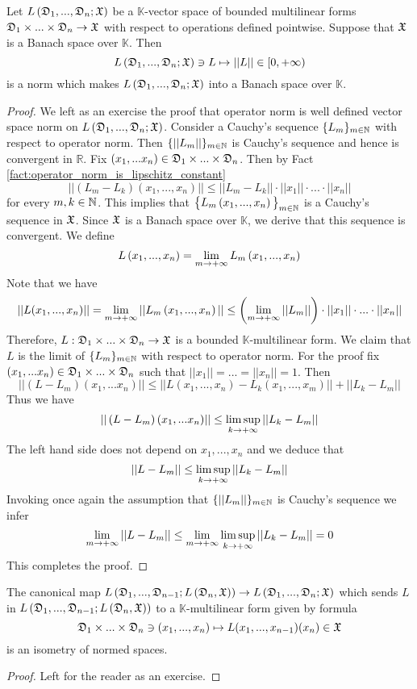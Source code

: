 \begin{theorem}\label{theorem:bounded_multilinear_maps_form_Banach_space_if_target_is_Banach}
Let $L\left({\mathfrak D}_1,...,{\mathfrak D}_n;{\mathfrak X}\right)$ be a $\mathbb{K}$-vector space of bounded multilinear forms ${\mathfrak D}_1\times ... \times {\mathfrak D}_n\rightarrow {\mathfrak X}$ with respect to operations defined pointwise. Suppose that ${\mathfrak X}$ is a Banach space over $\mathbb{K}$. Then 
$$L\left({\mathfrak D}_1,...,{\mathfrak D}_n;{\mathfrak X}\right) \ni L\mapsto ||L||\in [0,+\infty)$$
is a norm which makes $L\left({\mathfrak D}_1,...,{\mathfrak D}_n;{\mathfrak X}\right)$ into a Banach space over $\mathbb{K}$.
\end{theorem}
\begin{proof}
We left as an exercise the proof that operator norm is well defined vector space norm on $L\left({\mathfrak D}_1,...,{\mathfrak D}_n;{\mathfrak X}\right)$. Consider a Cauchy's sequence $\{L_m\}_{m\in {\mathbb N}}$ with respect to operator norm. Then $\{||L_m||\}_{m\in {\mathbb N}}$ is Cauchy's sequence and hence is convergent in $\mathbb{R}$. Fix $(x_1,...x_n)\in {\mathfrak D}_1\times ... \times {\mathfrak D}_n$. Then by Fact \ref{fact:operator_norm_is_lipschitz_constant}
$$||\left(L_m - L_k\right)\left(x_1,...,x_n\right)|| \leq ||L_m-L_k||\cdot ||x_1||\cdot ...\cdot ||x_n||$$
for every $m,k\in {\mathbb N}$. This implies that $\big\{L_m\left(x_1,...,x_n\right)\big\}_{m\in {\mathbb N}}$ is a Cauchy's sequence in ${\mathfrak X}$. Since ${\mathfrak X}$ is a Banach space over $\mathbb{K}$, we derive that this sequence is convergent. We define
$$L\left(x_1,...,x_n\right) = \lim_{m\rightarrow +\infty}L_m\left(x_1,...,x_n\right)$$
Note that we have
$$||L(x_1,...,x_n)|| = \lim_{m\rightarrow +\infty}||L_m\left(x_1,...,x_n\right)|| \leq \left(\lim_{m\rightarrow +\infty}||L_m||\right) \cdot ||x_1||\cdot ...\cdot ||x_n||$$
Therefore, $L:{\mathfrak D}_1\times ... \times {\mathfrak D}_n\rightarrow {\mathfrak X}$ is a bounded $\mathbb{K}$-multilinear form. We claim that $L$ is the limit of $\{L_m\}_{m\in {\mathbb N}}$ with respect to operator norm. For the proof fix $(x_1,...x_n)\in {\mathfrak D}_1\times ... \times {\mathfrak D}_n$ such that $||x_1||=...=||x_n|| = 1$. Then
$$||\left(L - L_m\right)(x_1,...x_n)|| \leq ||L(x_1,...,x_n) - L_k(x_1,...,x_m)|| + ||L_k - L_m||$$
Thus we have
$$||\left(L - L_m\right)(x_1,...x_n)|| \leq \limsup_{k\rightarrow +\infty}||L_k - L_m||$$
The left hand side does not depend on $x_1,...,x_n$ and we deduce that
$$||L - L_m|| \leq \limsup_{k\rightarrow +\infty}||L_k - L_m||$$
Invoking once again the assumption that $\{||L_m||\}_{m\in {\mathbb N}}$ is Cauchy's sequence we infer
$$\lim_{m\rightarrow +\infty}||L - L_m|| \leq \lim_{m\rightarrow +\infty}\limsup_{k\rightarrow +\infty}||L_k - L_m|| = 0$$
This completes the proof.
\end{proof}

\begin{proposition}\label{proposition:multilinear_maps_canonical_isometry}
The canonical map $L\left({\mathfrak D}_1,...,{\mathfrak D}_{n-1};L\left({\mathfrak D}_n,{\mathfrak X}\right)\right) \rightarrow L\left({\mathfrak D}_1,...,{\mathfrak D}_n;{\mathfrak X}\right)$
which sends $L$ in $L\left({\mathfrak D}_1,...,{\mathfrak D}_{n-1};L\left({\mathfrak D}_n,{\mathfrak X}\right)\right)$ to a $\mathbb{K}$-multilinear form given by formula 
$${\mathfrak D}_1\times ...\times {\mathfrak D}_n \ni (x_1,...,x_n) \mapsto L(x_1,...,x_{n-1})(x_n) \in {\mathfrak X}$$
is an isometry of normed spaces.
\end{proposition}
\begin{proof}
Left for the reader as an exercise.
\end{proof}


